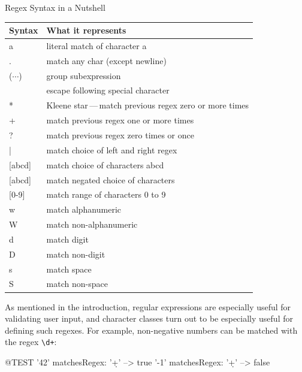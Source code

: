 \documentclass[10pt,twoside,chapterprefix=false]{scrbook}
\newcommand{\codecolor}{\color{blue!65}}
\renewcommand{\ct}{\lstinline[mathescape=false,basicstyle={\sffamily\upshape}]}
\renewcommand{\lct}[1]{{\codecolor\textsf{\textup{#1}}}}
\begin{document}
{\begin{table}
\begin{margincap}{Regex Syntax in a Nutshell}
	\centering
	\begin{tabular}{ll}
		\toprule
		Syntax & What it represents \\
		\midrule
		\lct{a}				&	literal match of character \lct{a} \\
		\lct{.}				&	match any char (except newline) \\
		\lct{($\cdots$)}		&	group subexpression \\
		\lct{{\escape}}	&	escape following special character \\
		\midrule
		\lct{*}				&	Kleene star\,---\,match previous regex zero or more times \\
		\lct{+}				&	match previous regex one or more times \\
		\lct{?}				&	match previous regex zero times or once \\
		\lct{|}				&	match choice of left and right regex \\
		\midrule
		\lct{[abcd]}		&	match choice of characters \lct{abcd} \\
		\lct{[{\caret}abcd]}	&	match negated choice of characters \\
		\lct{[0-9]}		&	match range of characters \lct{0} to \lct{9} \\
		\midrule
		\lct{{\escape}w}			&	match alphanumeric \\
		\lct{{\escape}W}			&	match non-alphanumeric \\
		\lct{{\escape}d}			&	match digit \\
		\lct{{\escape}D}			&	match non-digit \\
		\lct{{\escape}s}			&	match space \\
		\lct{{\escape}S}			&	match non-space \\
		\bottomrule
	\end{tabular}
	\label{tab:regexsyntax}
	\end{margincap}
\end{table}


As mentioned in the introduction, regular expressions are especially useful for validating user input, and character classes turn out to be especially useful for defining such regexes.
For example, non-negative numbers can be matched with the regex \ct{\d+}:

\begin{ToSh-code}{@TEST}
'42' matchesRegex: '\d+' --> true
'-1' matchesRegex: '\d+' --> false
\end{ToSh-code}

}
\end{document}
